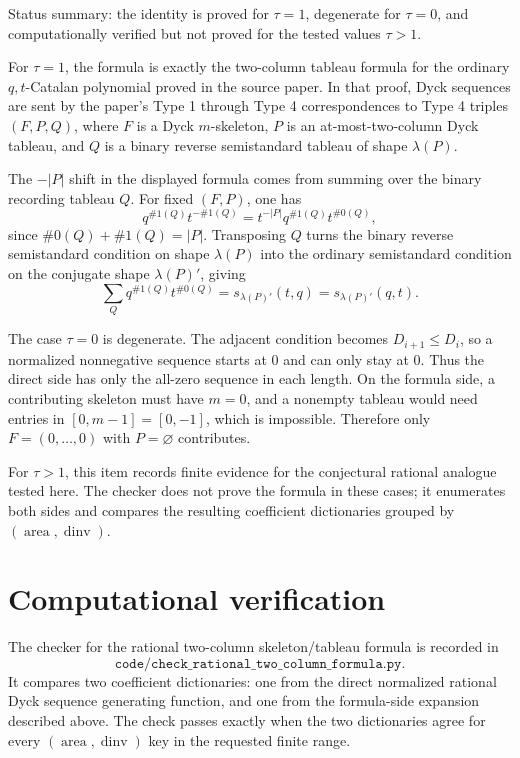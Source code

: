 \documentclass{article}
\DeclareMathOperator{\area}{area}
\DeclareMathOperator{\dinv}{dinv}
\begin{document}
Status summary: the identity is proved for \(\tau=1\), degenerate for
\(\tau=0\), and computationally verified but not proved for the tested
values \(\tau>1\).

For \(\tau=1\), the formula is exactly the two-column tableau formula for the
ordinary \(q,t\)-Catalan polynomial proved in the source paper.  In that
proof, Dyck sequences are sent by the paper's Type 1 through Type 4
correspondences to Type 4 triples \((F,P,Q)\), where \(F\) is a Dyck
\(m\)-skeleton, \(P\) is an at-most-two-column Dyck tableau, and \(Q\) is a
binary reverse semistandard tableau of shape \(\lambda(P)\).

The \(-|P|\) shift in the displayed formula comes from summing over the
binary recording tableau \(Q\).  For fixed \((F,P)\), one has
\[
  q^{\#1(Q)}t^{-\#1(Q)}
  =
  t^{-|P|}q^{\#1(Q)}t^{\#0(Q)},
\]
since \(\#0(Q)+\#1(Q)=|P|\).  Transposing \(Q\) turns the binary reverse
semistandard condition on shape \(\lambda(P)\) into the ordinary
semistandard condition on the conjugate shape \(\lambda(P)'\), giving
\[
  \sum_Q q^{\#1(Q)}t^{\#0(Q)}
  =
  s_{\lambda(P)'}(t,q)
  =
  s_{\lambda(P)'}(q,t).
\]

The case \(\tau=0\) is degenerate.  The adjacent condition becomes
\(D_{i+1}\leq D_i\), so a normalized nonnegative sequence starts at \(0\) and
can only stay at \(0\).  Thus the direct side has only the all-zero sequence
in each length.  On the formula side, a contributing skeleton must have
\(m=0\), and a nonempty tableau would need entries in \([0,m-1]=[0,-1]\),
which is impossible.  Therefore only \(F=(0,\ldots,0)\) with \(P=\varnothing\)
contributes.

For \(\tau>1\), this item records finite evidence for the conjectural
rational analogue tested here.  The checker does not prove the formula in
these cases; it enumerates both sides and compares the resulting coefficient
dictionaries grouped by \((\area,\dinv)\).

\section{Computational verification}

The checker for the rational two-column skeleton/tableau formula is recorded
in
\[
\texttt{code/check\_rational\_two\_column\_formula.py}.
\]
It compares two coefficient dictionaries: one from the direct normalized
rational Dyck sequence generating function, and one from the formula-side
expansion described above.  The check passes exactly when the two
dictionaries agree for every \((\operatorname{area},\operatorname{dinv})\)
key in the requested finite range.
\end{document}
